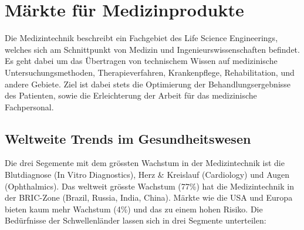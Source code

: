 \chapter{Märkte für Medizinprodukte}

Die Medizintechnik beschreibt ein Fachgebiet des Life Science Engineerings, welches sich am Schnittpunkt von Medizin und Ingenieurswissenschaften befindet. Es geht dabei um das Übertragen von technischem Wissen auf medizinische Untersuchungsmethoden, Therapieverfahren, Krankenpflege, Rehabilitation, und andere Gebiete. Ziel ist dabei stets die Optimierung der Behandlungsergebnisse des Patienten, sowie die Erleichterung der Arbeit für das medizinische Fachpersonal.

\section{Weltweite Trends im Gesundheitswesen}

Die drei Segemente mit dem grössten Wachstum in der Medizintechnik ist die Blutdiagnose (In Vitro Diagnostics), Herz \& Kreislauf (Cardiology) und Augen (Ophthalmics). Das weltweit grösste Wachstum (77\%) hat die Medizintechnik in der BRIC-Zone (Brazil, Russia, India, China). Märkte wie die USA und Europa bieten kaum mehr Wachstum (4\%) und das zu einem hohen Risiko. Die Bedürfnisse der Schwellenländer lassen sich in drei Segmente unterteilen:

